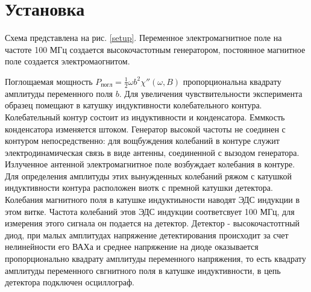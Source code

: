\documentclass[a4paper]{article}
\begin{document}
\section{Установка}

Схема представлена на рис. \ref{setup}. Переменное электромагнитное поле на частоте 100 МГц создается 
высокочастотным генератором, постоянное магнитное поле создается электромаогнитом. \par 

Поглощаемая мощность $P_{погл} = \frac{1}{2} \omega b^2 \chi''(\omega, B)$ пропорциональна квадрату амплитуды 
переменного поля $b$. Для увеличения чувствительности эксперимента образец помещают в катушку индуктивности колебательного контура.
Колебательный контур состоит из индуктивности и конденсатора. Еммкость конденсатора изменяется штоком. Генератор 
высокой частоты не соединен с контуром непосредственно: для вощбуждения колебаний в контуре служит электродинамическая связь 
в виде антенны, соединенной с вызодом генератора. Излученное антенной электромагнитное поле возбуждает колебания в контуре. Для 
определения амплитуды этих вынужденных колебаний ряжом с катушкой индуктивности контура расположен виотк с премной катушки детектора. Колебания 
магнитного поля в катушке индуктиыности наводят ЭДС индукции в этом витке. Частота колебаний этов ЭДС индукции соответсвует 100 МГц, для 
измерения этого сигнала он подается на детектор. Детектор - высокочастотгный диод, при малых амплитудах напряжение детектирования происходит за счет нелинейности его ВАХа и 
среднее напряжение на диоде оказывается пропорционально квадрату амплитуды переменного напряжения, то есть квадрату амплитуды переменного свгнитного 
поля в катушке индуктивности, в цепь детектора подключен осциллограф.
\end{document}
